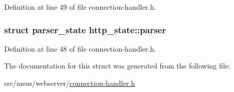 Definition at line 49 of file connection-\/handler.\-h.

\hypertarget{structhttp__state_a3eda42ab7c2b2dfbc61a1cc5eb076555}{
\subsubsection[{parser}]{\setlength{\rightskip}{0pt plus 5cm}struct {\bf parser\-\_\-state} http\-\_\-state\-::parser}}\label{structhttp__state_a3eda42ab7c2b2dfbc61a1cc5eb076555}


Definition at line 48 of file connection-\/handler.\-h.



The documentation for this struct was generated from the following file\-:\begin{DoxyCompactItemize}
\item 
src/msus/webserver/\hyperlink{connection-handler_8h}{connection-\/handler.\-h}\end{DoxyCompactItemize}
